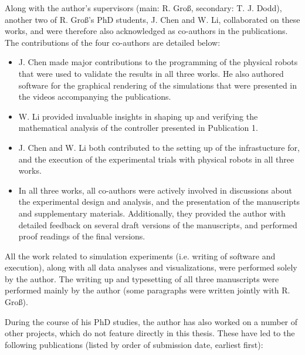 Along with the author's supervisors (main: R. Gro{\ss}, secondary: T. J. Dodd), another two of R. Gro{\ss}'s PhD students, J. Chen and W. Li, collaborated on these works, and were therefore also acknowledged as co-authors in the publications. The contributions of the four co-authors are detailed below:
\begin{itemize}
	\item J. Chen made major contributions to the programming of the physical robots that were used to validate the results in all three works. He also authored software for the graphical rendering of the simulations that were presented in the videos accompanying the publications.
	\item W. Li provided invaluable insights in shaping up and verifying the mathematical analysis of the controller presented in Publication 1.
	\item J. Chen and W. Li both contributed to the setting up of the infrastucture for, and the execution of the experimental trials with physical robots in all three works.
	\item In all three works, all co-authors were actively involved in discussions about the experimental design and analysis, and the presentation of the manuscripts and supplementary materials. Additionally, they provided the author with detailed feedback on several draft versions of the manuscripts, and performed proof readings of the final versions.
\end{itemize}
All the work related to simulation experiments (i.e. writing of software and execution), along with all data analyses and visualizations, were performed solely by the author. The writing up and typesetting of all three manuscripts were performed mainly by the author (some paragraphs were written jointly with R. Gro{\ss}).

During the course of his PhD studies, the author has also worked on a number of other projects, which do not feature directly in this thesis. These have led to the following publications (listed by order of submission date, earliest first):

